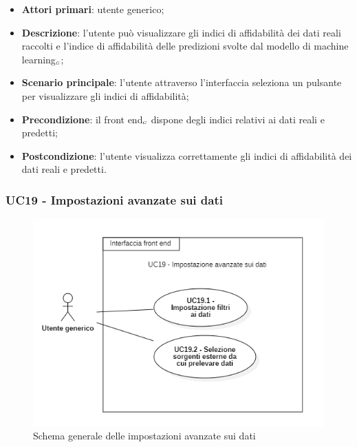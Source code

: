 \begin{itemize}
	\item \textbf{Attori primari}: utente generico;
	\item \textbf{Descrizione}: l'utente può visualizzare gli indici di affidabilità dei dati reali raccolti e l'indice di affidabilità delle predizioni svolte dal modello di machine learning$_{\scaleto{G}{3pt}}$;
	\item \textbf{Scenario principale}: l'utente attraverso l'interfaccia seleziona un pulsante per visualizzare gli indici di affidabilità;
	\item \textbf{Precondizione}: il front end$_{\scaleto{G}{3pt}}$ dispone degli indici relativi ai dati reali e predetti;
	\item \textbf{Postcondizione}: l'utente visualizza correttamente gli indici di affidabilità dei dati reali e predetti.
\end{itemize}

\subsubsection{UC19 - Impostazioni avanzate sui dati}\label{CasiDUsoCasiDUsoFacoltativiTraUnUtenteEIlFrontEndElencoCasiDUsoUC11ImpostazioniAvanzateSuiDati}

\begin{center}
	\begin{figure}[H]
		\centering\includegraphics[scale=0.7]{../immagini/attori_casi/UC_19.png}
		\caption{Schema generale delle impostazioni avanzate sui dati}
	\end{figure}
\end{center}

